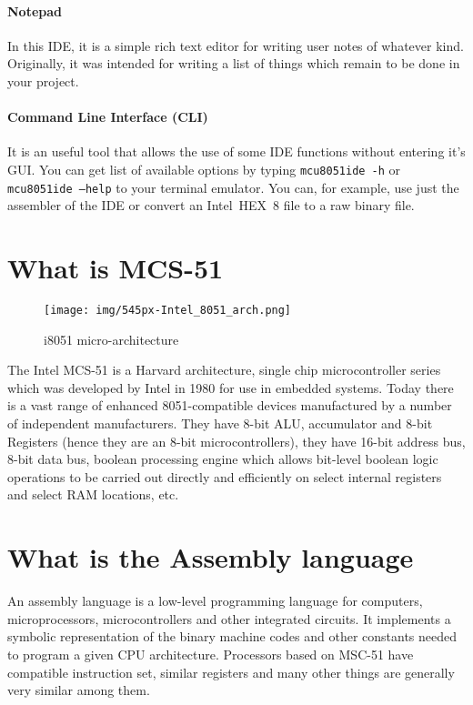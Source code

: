 \documentclass[a4paper,twoside,12pt]{book}
\begin{document}
		\paragraph{Notepad} In this IDE, it is a simple rich text editor for writing user notes of whatever kind. Originally, it was intended for writing a list of things which remain to be done in your project.

		\paragraph{Command Line Interface (CLI)} It is an useful tool that allows the use of some IDE functions without entering it's GUI. You can get list of available options by typing \texttt{mcu8051ide -h} or \texttt{mcu8051ide --help} to your terminal emulator. You can, for example, use just the assembler of the IDE or convert an Intel\textregistered{}~HEX~8 file to a raw binary file.

	\section{What is MCS-51}
		\begin{wrapfigure}{r}{120pt}
			\centering{}
			\texttt{[image: img/545px-Intel\_8051\_arch.png]}
			\caption{i8051 micro-architecture}
		\end{wrapfigure}
		The Intel MCS-51 is a Harvard architecture, single chip microcontroller series which was developed by Intel in 1980 for use in embedded systems. Today there is a vast range of enhanced 8051-compatible devices manufactured by a number of independent manufacturers. They have 8-bit ALU, accumulator and 8-bit Registers (hence they are an 8-bit microcontrollers), they have 16-bit address bus, 8-bit data bus, boolean processing engine which allows bit-level boolean logic operations to be carried out directly and efficiently on select internal registers and select RAM locations, etc.
	\enlargethispage{10\baselineskip}

	\section{What is the Assembly language}
		An assembly language is a low-level programming language for computers, microprocessors, microcontrollers and other integrated circuits. It implements a symbolic representation of the binary machine codes and other constants needed to program a given CPU architecture. Processors based on MSC-51 have compatible instruction set, similar registers and many other things are generally very similar among them.
\end{document}
